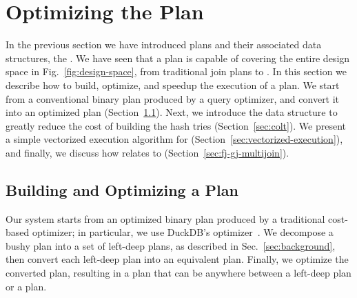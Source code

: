 \section{Optimizing the \FJ Plan}

\label{sec:optimization}

In the previous section we have introduced \FJ plans and their associated
data structures, the \GHTs.  We have seen that a \FJ plan is capable
of covering the entire design space in Fig.~\ref{fig:design-space},
from traditional join plans to \GJ.  In this section we describe how
to build, optimize, and speedup the execution of a \FJ plan.  We start
from a conventional binary plan produced by a query optimizer, and convert
it into an optimized \FJ plan (Section~\ref{sec:bj-to-fj}). Next, we
introduce the \COLT data structure to greatly reduce the cost of
building the hash tries (Section~\ref{sec:colt}).  We present a simple
vectorized execution algorithm for \FJ
(Section~\ref{sec:vectorized-execution}), and finally, we discuss how
\FJ relates to \GJ (Section~\ref{sec:fj-gj-multijoin}).


\subsection{Building and Optimizing a \FJ Plan}\label{sec:bj-to-fj}

Our system starts from an optimized binary plan produced by a
traditional cost-based optimizer; in particular, we use DuckDB's
optimizer~\cite{DBLP:conf/cidr/RaasveldtM20,DBLP:conf/vldb/Raasveldt22}. We
decompose a bushy plan into a set of left-deep plans, as described in
Sec.~\ref{sec:background}, then convert each left-deep plan into an
equivalent \FJ plan.  Finally, we optimize the converted \FJ plan,
resulting in a plan that can be anywhere between a left-deep plan or a
\GJ plan.

